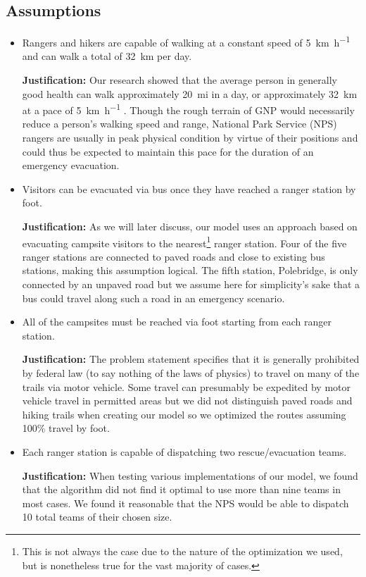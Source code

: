 \documentclass[12pt]{article}
\begin{document}
\subsection{Assumptions}
\label{subsec:assumptions}
\begin{itemize}
    \item Rangers and hikers are capable of walking at a constant speed of \SI{5}{\kilo\meter\per\hour} and can walk a total of \SI{32}{\kilo\meter} per day.
    
    \textbf{Justification:} Our research showed that the average person in generally good health can walk approximately \SI{20}{mi} in a day, or approximately \SI{32}{\kilo\meter} at a pace of \SI{5}{\kilo\meter\per\hour} \cite{walkingDistance}. Though the rough terrain of GNP would necessarily reduce a person's walking speed and range, National Park Service (NPS) rangers are usually in peak physical condition by virtue of their positions and could thus be expected to maintain this pace for the duration of an emergency evacuation.
    
    \item Visitors can be evacuated via bus once they have reached a ranger station by foot. 
    
    \textbf{Justification:} As we will later discuss, our model uses an approach based on evacuating campsite visitors to the nearest\footnote{This is not always the case due to the nature of the optimization we used, but is nonetheless true for the vast majority of cases.} ranger station. Four of the five ranger stations are connected to paved roads and close to existing bus stations, making this assumption logical. The fifth station, Polebridge, is only connected by an unpaved road but we assume here for simplicity's sake that a bus could travel along such a road in an emergency scenario.
    
    \item All of the campsites must be reached via foot starting from each ranger station.
    
    \textbf{Justification:} The problem statement specifies that it is generally prohibited by federal law (to say nothing of the laws of physics) to travel on many of the trails via motor vehicle. Some travel can presumably be expedited by motor vehicle travel in permitted areas but we did not distinguish paved roads and hiking trails when creating our model so we optimized the routes assuming 100\% travel by foot.
    
    \item Each ranger station is capable of dispatching two rescue/evacuation teams.
    
    \textbf{Justification:} When testing various implementations of our model, we found that the algorithm did not find it optimal to use more than nine teams in most cases. We found it reasonable that the NPS would be able to dispatch 10 total teams of their chosen size.
\end{itemize}
\end{document}
